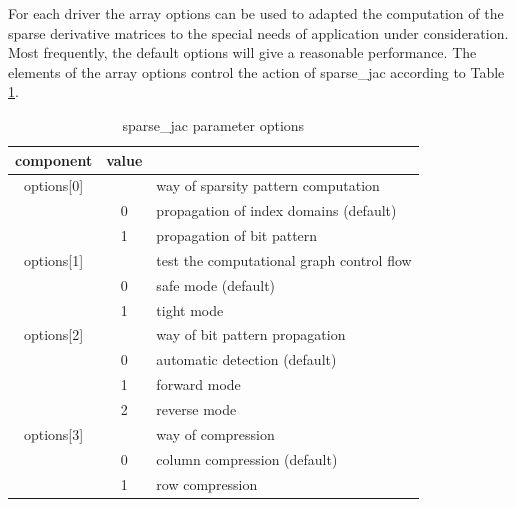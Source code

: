 \documentclass[11pt,twoside]{article}
\begin{document}
For each driver the array {\sf options} can be used to adapted the 
computation of the sparse derivative matrices to the special
needs of application under consideration. Most frequently, the default options
will give a reasonable performance. The elements of the array {\sf options} control the action of 
{\sf sparse\_jac} according to Table \ref{options_sparse_jac}.
\begin{table}[h]
\center
\begin{tabular}{|c|c|l|} \hline
component & value &  \\ \hline
{\sf options[0]} &    &  way of sparsity pattern computation \\
                 & 0  &  propagation of index domains (default) \\
                 & 1  &  propagation of bit pattern \\ \hline
{\sf options[1]} &    &  test the computational graph control flow \\
                 & 0  &  safe mode (default) \\
                 & 1  &  tight mode \\ \hline
{\sf options[2]} &    &  way of bit pattern propagation \\
                 & 0  &  automatic detection (default) \\
                 & 1  &  forward mode \\ 
                 & 2  &  reverse mode \\ \hline
{\sf options[3]} &    &  way of compression \\
                 & 0  &  column compression (default) \\
                 & 1  &  row compression \\ \hline
\end{tabular}
\caption{ {\sf sparse\_jac} parameter {\sf options}\label{options_sparse_jac}}
\end{table}           
\end{document}
